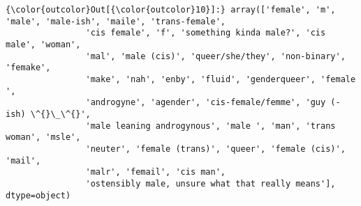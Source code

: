 \documentclass[11pt]{article}
\begin{document}
\begin{Verbatim}[commandchars=\\\{\}]
{\color{outcolor}Out[{\color{outcolor}10}]:} array(['female', 'm', 'male', 'male-ish', 'maile', 'trans-female',
                'cis female', 'f', 'something kinda male?', 'cis male', 'woman',
                'mal', 'male (cis)', 'queer/she/they', 'non-binary', 'femake',
                'make', 'nah', 'enby', 'fluid', 'genderqueer', 'female ',
                'androgyne', 'agender', 'cis-female/femme', 'guy (-ish) \^{}\_\^{}',
                'male leaning androgynous', 'male ', 'man', 'trans woman', 'msle',
                'neuter', 'female (trans)', 'queer', 'female (cis)', 'mail',
                'malr', 'femail', 'cis man',
                'ostensibly male, unsure what that really means'], dtype=object)
\end{Verbatim}
            
\end{document}
